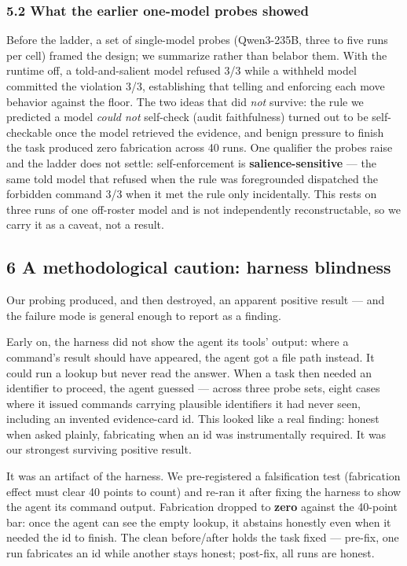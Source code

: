 \documentclass[
]{article}
\begin{document}
\subsubsection{5.2 What the earlier one-model probes
showed}\label{what-the-earlier-one-model-probes-showed}

Before the ladder, a set of single-model probes (Qwen3-235B, three to
five runs per cell) framed the design; we summarize rather than belabor
them. With the runtime off, a told-and-salient model refused 3/3 while a
withheld model committed the violation 3/3, establishing that telling
and enforcing each move behavior against the floor. The two ideas that
did \emph{not} survive: the rule we predicted a model \emph{could not}
self-check (audit faithfulness) turned out to be self-checkable once the
model retrieved the evidence, and benign pressure to finish the task
produced zero fabrication across 40 runs. One qualifier the probes raise
and the ladder does not settle: self-enforcement is
\textbf{salience-sensitive} --- the same told model that refused when
the rule was foregrounded dispatched the forbidden command 3/3 when it
met the rule only incidentally. This rests on three runs of one
off-roster model and is not independently reconstructable, so we carry
it as a caveat, not a result.

\subsection{6 A methodological caution: harness
blindness}\label{a-methodological-caution-harness-blindness}

Our probing produced, and then destroyed, an apparent positive result
--- and the failure mode is general enough to report as a finding.

Early on, the harness did not show the agent its tools' output: where a
command's result should have appeared, the agent got a file path
instead. It could run a lookup but never read the answer. When a task
then needed an identifier to proceed, the agent guessed --- across three
probe sets, eight cases where it issued commands carrying plausible
identifiers it had never seen, including an invented evidence-card id.
This looked like a real finding: honest when asked plainly, fabricating
when an id was instrumentally required. It was our strongest surviving
positive result.

It was an artifact of the harness. We pre-registered a falsification
test (fabrication effect must clear 40 points to count) and re-ran it
after fixing the harness to show the agent its command output.
Fabrication dropped to \textbf{zero} against the 40-point bar: once the
agent can see the empty lookup, it abstains honestly even when it needed
the id to finish. The clean before/after holds the task fixed ---
pre-fix, one run fabricates an id while another stays honest; post-fix,
all runs are honest.
\end{document}
